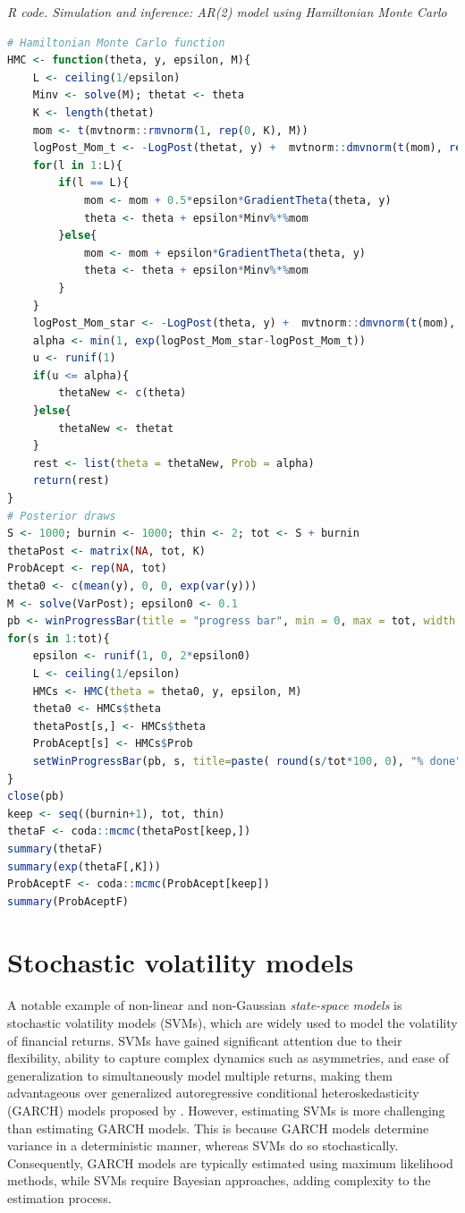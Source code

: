 \begin{tcolorbox}[enhanced,width=4.67in,center upper,
	fontupper=\large\bfseries,drop shadow southwest,sharp corners]
	\textit{R code. Simulation and inference: AR(2) model using Hamiltonian Monte Carlo}
	\begin{VF}
		\begin{lstlisting}[language=R]
# Hamiltonian Monte Carlo function
HMC <- function(theta, y, epsilon, M){
	L <- ceiling(1/epsilon)
	Minv <- solve(M); thetat <- theta
	K <- length(thetat)
	mom <- t(mvtnorm::rmvnorm(1, rep(0, K), M))
	logPost_Mom_t <- -LogPost(thetat, y) +  mvtnorm::dmvnorm(t(mom), rep(0, K), M, log = TRUE)  
	for(l in 1:L){
		if(l == L){
			mom <- mom + 0.5*epsilon*GradientTheta(theta, y)
			theta <- theta + epsilon*Minv%*%mom
		}else{
			mom <- mom + epsilon*GradientTheta(theta, y)
			theta <- theta + epsilon*Minv%*%mom
		}
	}
	logPost_Mom_star <- -LogPost(theta, y) +  mvtnorm::dmvnorm(t(mom), rep(0, K), M, log = TRUE)  
	alpha <- min(1, exp(logPost_Mom_star-logPost_Mom_t))
	u <- runif(1)
	if(u <= alpha){
		thetaNew <- c(theta)
	}else{
		thetaNew <- thetat
	}
	rest <- list(theta = thetaNew, Prob = alpha)
	return(rest)
}
# Posterior draws
S <- 1000; burnin <- 1000; thin <- 2; tot <- S + burnin
thetaPost <- matrix(NA, tot, K)
ProbAcept <- rep(NA, tot)
theta0 <- c(mean(y), 0, 0, exp(var(y))) 
M <- solve(VarPost); epsilon0 <- 0.1
pb <- winProgressBar(title = "progress bar", min = 0, max = tot, width = 300)
for(s in 1:tot){
	epsilon <- runif(1, 0, 2*epsilon0)
	L <- ceiling(1/epsilon)
	HMCs <- HMC(theta = theta0, y, epsilon, M) 
	theta0 <- HMCs$theta 
	thetaPost[s,] <- HMCs$theta
	ProbAcept[s] <- HMCs$Prob
	setWinProgressBar(pb, s, title=paste( round(s/tot*100, 0), "% done"))
}
close(pb)
keep <- seq((burnin+1), tot, thin)
thetaF <- coda::mcmc(thetaPost[keep,])
summary(thetaF)
summary(exp(thetaF[,K]))
ProbAceptF <- coda::mcmc(ProbAcept[keep])
summary(ProbAceptF)
\end{lstlisting}
	\end{VF}
\end{tcolorbox} 
    
\section{Stochastic volatility models}\label{sec83}
A notable example of non-linear and non-Gaussian \textit{state-space models} is stochastic volatility models (SVMs), which are widely used to model the volatility of financial returns. SVMs have gained significant attention due to their flexibility, ability to capture complex dynamics such as asymmetries, and ease of generalization to simultaneously model multiple returns, making them advantageous over generalized autoregressive conditional heteroskedasticity (GARCH) models proposed by \cite{bollerslev_1986}. However, estimating SVMs is more challenging than estimating GARCH models. This is because GARCH models determine variance in a deterministic manner, whereas SVMs do so stochastically. Consequently, GARCH models are typically estimated using maximum likelihood methods, while SVMs require Bayesian approaches, adding complexity to the estimation process.

